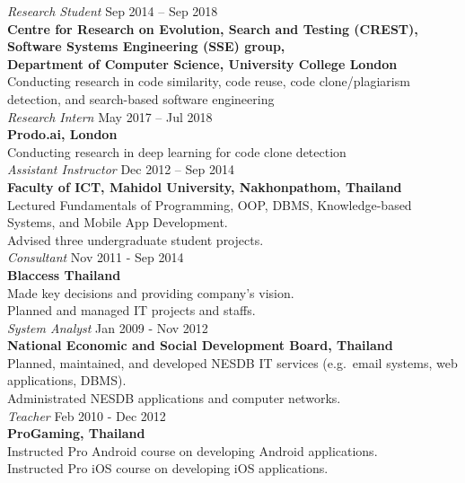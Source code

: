 \documentclass[margin, 10pt]{res} %
\begin{document}
\begin{resume}
{\sl Research Student} \hfill Sep 2014 -- Sep 2018 \\
\textbf{Centre for Research on Evolution, Search and Testing (CREST), \\ Software Systems Engineering (SSE) group, \\ Department of Computer Science, University College London}\\
Conducting research in code similarity, code reuse, code clone/plagiarism detection, and search-based software engineering \vspace{4mm} \\
{\sl Research Intern} \hfill May 2017 -- Jul 2018 \\
\textbf{Prodo.ai, London}\\
Conducting research in deep learning for code clone detection 
\vspace{4mm} \\
{\sl Assistant Instructor} \hfill Dec 2012 -- Sep 2014 \\
\textbf{Faculty of ICT, Mahidol University, Nakhonpathom, Thailand} \\
Lectured Fundamentals of Programming, OOP, DBMS, Knowledge-based Systems, and Mobile App Development. \\
Advised three undergraduate student projects. \vspace{3mm} \\
{\sl Consultant} \hfill Nov 2011 - Sep 2014 \\
\textbf{Blaccess Thailand} \\
Made key decisions and providing company's vision. \\
Planned and managed IT projects and staffs. \vspace{3mm} \\
{\sl System Analyst} \hfill Jan 2009 - Nov 2012\\
\textbf{National Economic and Social Development Board, Thailand}\\
Planned, maintained, and developed NESDB IT services (e.g.~email systems, web applications, DBMS).\\
Administrated NESDB applications and computer networks. \vspace{3mm} \\
{\sl Teacher} \hfill Feb 2010 - Dec 2012 \\
\textbf{ProGaming, Thailand}\\
Instructed Pro Android course on developing Android applications.\\
Instructed Pro iOS course on developing iOS applications. \vspace{3mm} \\

\end{resume}
\end{document}
